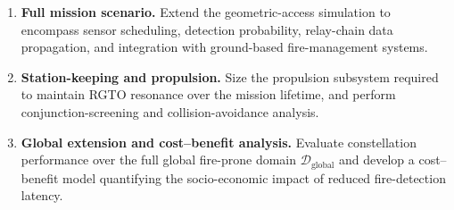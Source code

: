 \begin{enumerate}
    \item \textbf{Full mission scenario.} Extend the geometric-access simulation to encompass sensor scheduling, detection probability, relay-chain data propagation, and integration with ground-based fire-management systems.
    \item \textbf{Station-keeping and propulsion.} Size the propulsion subsystem required to maintain RGTO resonance over the mission lifetime, and perform conjunction-screening and collision-avoidance analysis.
    \item \textbf{Global extension and cost--benefit analysis.} Evaluate constellation performance over the full global fire-prone domain $\mathcal{D}_{\mathrm{global}}$ and develop a cost--benefit model quantifying the socio-economic impact of reduced fire-detection latency.
\end{enumerate}